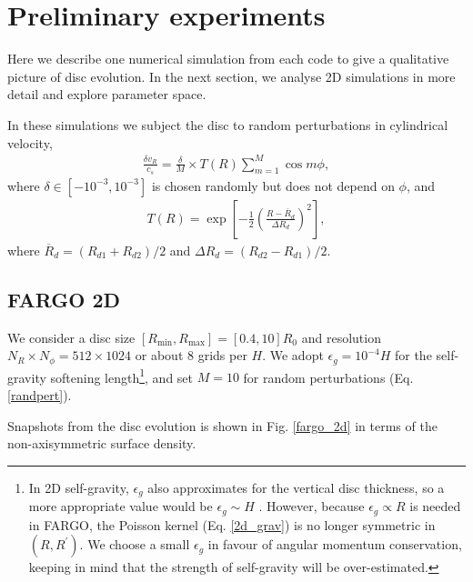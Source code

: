 
\section{Preliminary experiments}
Here we describe one numerical simulation from each code to give a
qualitative picture of disc evolution. In the next section, we analyse
2D simulations in more detail and explore parameter space.  

In these simulations we subject the disc to random perturbations in
cylindrical velocity,
\begin{align}\label{randpert}
  \frac{\delta v_R}{c_s} = \frac{\delta}{M}\times T(R) \sum_{m=1}^M\cos{m\phi},
\end{align}
where $\delta\in[-10^{-3},10^{-3}]$ is chosen randomly but does not
depend on $\phi$, and 
\begin{align}
  T(R) =
  \exp{\left[-\frac{1}{2}\left(\frac{R-\overline{R}_d}{\Delta
          R_d}\right)^2\right]}, 
\end{align}
where $\overline{R}_d = (R_{d1}+R_{d2})/2$ and $\Delta R_d =
(R_{d2}-R_{d1})/2$. 
\subsection{FARGO 2D}\label{fargo_fiducial}
We consider a disc size $[R_\mathrm{min}, R_\mathrm{max}] =
[0.4,10]R_0$ and resolution $N_R\times N_\phi = 512\times 1024$ or
about $8$ grids per $H$. We adopt $\epsilon_g=10^{-4}H$ for the 
self-gravity softening length\footnote{In 2D self-gravity, $\epsilon_g$ also
  approximates for the vertical disc thickness, so a more appropriate
  value would be $\epsilon_g\sim H$ \citep{muller12}. However, because
  $\epsilon_g\propto R$ is needed in FARGO, the Poisson kernel
  (Eq. \ref{2d_grav}) is no longer symmetric in $(R,R^\prime)$. We
  choose a small  
  $\epsilon_g$ in favour of angular momentum conservation, keeping in
  mind that the strength of self-gravity will be over-estimated.}, and 
set $M=10$ for random perturbations (Eq. \ref{randpert}). 

Snapshots from the disc evolution is shown in Fig. \ref{fargo_2d} in
terms of the non-axisymmetric surface density. 


